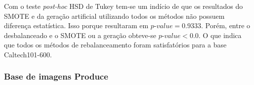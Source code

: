 
Com o teste \textit{post-hoc} HSD de Tukey tem-se um indício de que os resultados do SMOTE e da geração artificial utilizando todos os métodos não possuem diferença estatística. Isso porque resultaram em $\textit{p-value} = 0.9333$. Porém, entre o desbalanceado e o SMOTE ou a geração obteve-se $\textit{p-value} < 0.0$. O que indica que todos os métodos de rebalanceamento foram satisfatórios para a base Caltech101-600.

\subsubsection{Base de imagens Produce}


